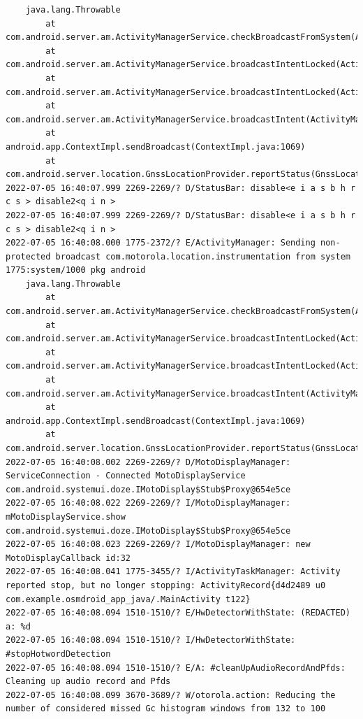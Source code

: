 \documentclass[a4paper,12pt]{book}
\begin{document}
\begin{lstlisting}
    java.lang.Throwable
        at com.android.server.am.ActivityManagerService.checkBroadcastFromSystem(ActivityManagerService.java:15425)
        at com.android.server.am.ActivityManagerService.broadcastIntentLocked(ActivityManagerService.java:15979)
        at com.android.server.am.ActivityManagerService.broadcastIntentLocked(ActivityManagerService.java:15442)
        at com.android.server.am.ActivityManagerService.broadcastIntent(ActivityManagerService.java:16227)
        at android.app.ContextImpl.sendBroadcast(ContextImpl.java:1069)
        at com.android.server.location.GnssLocationProvider.reportStatus(GnssLocationProvider.java:1497)
2022-07-05 16:40:07.999 2269-2269/? D/StatusBar: disable<e i a s b h r c s > disable2<q i n >
2022-07-05 16:40:07.999 2269-2269/? D/StatusBar: disable<e i a s b h r c s > disable2<q i n >
2022-07-05 16:40:08.000 1775-2372/? E/ActivityManager: Sending non-protected broadcast com.motorola.location.instrumentation from system 1775:system/1000 pkg android
    java.lang.Throwable
        at com.android.server.am.ActivityManagerService.checkBroadcastFromSystem(ActivityManagerService.java:15425)
        at com.android.server.am.ActivityManagerService.broadcastIntentLocked(ActivityManagerService.java:16073)
        at com.android.server.am.ActivityManagerService.broadcastIntentLocked(ActivityManagerService.java:15442)
        at com.android.server.am.ActivityManagerService.broadcastIntent(ActivityManagerService.java:16227)
        at android.app.ContextImpl.sendBroadcast(ContextImpl.java:1069)
        at com.android.server.location.GnssLocationProvider.reportStatus(GnssLocationProvider.java:1497)
2022-07-05 16:40:08.002 2269-2269/? D/MotoDisplayManager: ServiceConnection - Connected MotoDisplayService com.android.systemui.doze.IMotoDisplay$Stub$Proxy@654e5ce
2022-07-05 16:40:08.022 2269-2269/? I/MotoDisplayManager: mMotoDisplayService.show com.android.systemui.doze.IMotoDisplay$Stub$Proxy@654e5ce
2022-07-05 16:40:08.023 2269-2269/? I/MotoDisplayManager: new MotoDisplayCallback id:32
2022-07-05 16:40:08.041 1775-3455/? I/ActivityTaskManager: Activity reported stop, but no longer stopping: ActivityRecord{d4d2489 u0 com.example.osmdroid_app_java/.MainActivity t122}
2022-07-05 16:40:08.094 1510-1510/? E/HwDetectorWithState: (REDACTED) a: %d
2022-07-05 16:40:08.094 1510-1510/? I/HwDetectorWithState: #stopHotwordDetection
2022-07-05 16:40:08.094 1510-1510/? E/A: #cleanUpAudioRecordAndPfds: Cleaning up audio record and Pfds
2022-07-05 16:40:08.099 3670-3689/? W/otorola.action: Reducing the number of considered missed Gc histogram windows from 132 to 100

\end{lstlisting}
\end{document}
